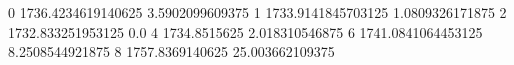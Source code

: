 0 1736.4234619140625 3.5902099609375
1 1733.9141845703125 1.0809326171875
2 1732.833251953125 0.0
4 1734.8515625 2.018310546875
6 1741.0841064453125 8.2508544921875
8 1757.8369140625 25.003662109375
